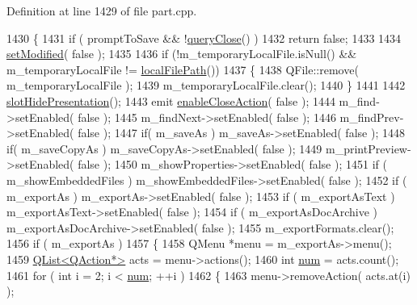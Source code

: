 Definition at line 1429 of file part.\+cpp.


\begin{DoxyCode}
1430 \{
1431     \textcolor{keywordflow}{if} ( promptToSave && !\hyperlink{classOkular_1_1Part_a198e4caf3a79cea6e57be6e4b187152c}{queryClose}() )
1432         \textcolor{keywordflow}{return} \textcolor{keyword}{false};
1433 
1434     \hyperlink{classKParts_1_1ReadWritePart_a3d3c236bfa46585c595eb8fca1f8b50a}{setModified}( \textcolor{keyword}{false} );
1435 
1436     \textcolor{keywordflow}{if} (!m\_temporaryLocalFile.isNull() && m\_temporaryLocalFile != \hyperlink{classKParts_1_1ReadOnlyPart_a9c411f8471de1a852c8595719d179946}{localFilePath}())
1437     \{
1438         QFile::remove( m\_temporaryLocalFile );
1439         m\_temporaryLocalFile.clear();
1440     \}
1441 
1442     \hyperlink{classOkular_1_1Part_a5144c0676e583a84410c106dca86f1e6}{slotHidePresentation}();
1443     emit \hyperlink{classOkular_1_1Part_a7cdc8bd152358129c9033f8ae57ac022}{enableCloseAction}( \textcolor{keyword}{false} );
1444     m\_find->setEnabled( \textcolor{keyword}{false} );
1445     m\_findNext->setEnabled( \textcolor{keyword}{false} );
1446     m\_findPrev->setEnabled( \textcolor{keyword}{false} );
1447     \textcolor{keywordflow}{if}( m\_saveAs )  m\_saveAs->setEnabled( \textcolor{keyword}{false} );
1448     \textcolor{keywordflow}{if}( m\_saveCopyAs ) m\_saveCopyAs->setEnabled( \textcolor{keyword}{false} );
1449     m\_printPreview->setEnabled( \textcolor{keyword}{false} );
1450     m\_showProperties->setEnabled( \textcolor{keyword}{false} );
1451     \textcolor{keywordflow}{if} ( m\_showEmbeddedFiles ) m\_showEmbeddedFiles->setEnabled( \textcolor{keyword}{false} );
1452     \textcolor{keywordflow}{if} ( m\_exportAs ) m\_exportAs->setEnabled( \textcolor{keyword}{false} );
1453     \textcolor{keywordflow}{if} ( m\_exportAsText ) m\_exportAsText->setEnabled( \textcolor{keyword}{false} );
1454     \textcolor{keywordflow}{if} ( m\_exportAsDocArchive ) m\_exportAsDocArchive->setEnabled( \textcolor{keyword}{false} );
1455     m\_exportFormats.clear();
1456     \textcolor{keywordflow}{if} ( m\_exportAs )
1457     \{
1458         QMenu *menu = m\_exportAs->menu();
1459         \hyperlink{classQList}{QList<QAction*>} acts = menu->actions();
1460         \textcolor{keywordtype}{int} \hyperlink{dvi_2util_8cpp_acc54804c2bc92eef873c373c37b69ff7}{num} = acts.count();
1461         \textcolor{keywordflow}{for} ( \textcolor{keywordtype}{int} i = 2; i < \hyperlink{dvi_2util_8cpp_acc54804c2bc92eef873c373c37b69ff7}{num}; ++i )
1462         \{
1463             menu->removeAction( acts.at(i) );

\end{DoxyCode}
